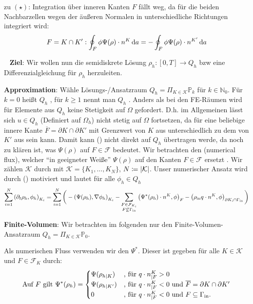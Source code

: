 \begin{remark}
	zu $ (\star) $: Integration über inneren Kanten $ F $ fällt weg, da für die beiden Nachbarzellen wegen der äußeren Normalen in unterschiedliche Richtungen integriert wird:
	\[ F = K \cap K': \oint_{F}  \phi \Psi(\rho) \cdot n^K \mathop{}\!\mathrm{d} a = - \oint_{F} \phi \Psi(\rho) \cdot n^{K'} \mathop{}\!\mathrm{d} a\]
\end{remark}
\ \newline
\textbf{Ziel}:
Wir wollen nun die semidiskrete Lösung $ \rho_h: [0,T] \to Q_h $ bzw eine Differenzialgleichung für $ \rho_h $ herzuleiten. 

\textbf{Approximation}:
Wähle Lösungs-/Ansatzraum $ Q_h = \Pi_{K\in\mathcal{K}} \mathbb{P}_k $ für $ k \in \mathbb{N}_0 $. Für $ k = 0 $ heißt $ Q_h $ , für $ k \geq 1 $ nennt man $ Q_h $ . Anders als bei den FE-Räumen wird für Elemente aus $ Q_h $ keine Stetigkeit auf $ \Omega $ gefordert. D.h. im Allgemeinen lässt sich $ u \in Q_h $ (Definiert auf $ \Omega_h $) nicht stetig auf $ \Omega $ fortsetzen, da für eine beliebige innere Kante $ \overline{F} = \partial K \cap \partial K' $ mit Grenzwert von $ K $ aus unterschiedlich zu dem von $ K' $ aus sein kann. Damit kann (\sun) nicht direkt auf $ Q_h $ übertragen werde, da noch zu klären ist, was $ \Psi(\rho) $ auf $ F \in \mathcal{F} $ bedeutet. Wir betrachten den  (numerical flux), welcher \enquote{in geeigneter Weiße} $ \Psi(\rho) $ auf den Kanten $ F \in \mathcal{F} $ ersetzt . Wir zählen $ \mathcal{K} $ durch mit $ \mathcal{K} = \{K_1 , \dots , K_N\} $, $ N \coloneqq \abs{\mathcal{K}} $.
Unser numerischer Ansatz wird durch (\sun) motiviert und lautet für alle $ \phi_h \in Q_h $
\[
\sum_{i = 1}^{N} \left(\partial_t \rho_h, \phi_h  \right)_{K_i}  = \sum_{i=1}^{N} \bigg(- \left(\Psi(\rho_h), \nabla\phi_h \right)_{K_i} -\sum_{\substack{F \in \mathcal{F}_{K_i} \\ F \not\subseteq \Gamma_{{\text{in}}}}} \left(\Psi^*(\rho_h) \cdot n^K, \phi \right)_{F} - \left(\rho_{\text{in}} q \cdot n^K, \phi \right)_{\partial K_i \cap \Gamma_{{\text{in}}}} \bigg)
\]



\textbf{Finite-Volumen}:
Wir betrachten im folgenden nur den Finite-Volumen-Ansatzraum $ Q_h = \Pi_{K \in \mathcal{K}} \mathbb{P}_0 $. 

Als numerischen Fluss verwenden wir den  $ \Psi^* $. Dieser ist gegeben für alle $ K \in \mathcal{K} $ und $ F \in \mathcal{F}_K $ durch:
\begin{gather*}
	\text{Auf } F \text{ gilt }\Psi^*(\rho_h) = \begin{cases}
	\Psi(\rho_{h|K}) &\text{, für } q \cdot n^K_{|F} > 0\\
	\Psi(\rho_{h|K'}) &\text{, für } q\cdot n^K_{|F} < 0 \text{ und } \overline{F} = \partial K \cap \partial K'\\
	0 &\text{, für } q\cdot n^K_{|F} < 0 \text{ und } F \subseteq \Gamma_{{\text{in}}}.
	\end{cases}  
\end{gather*}

